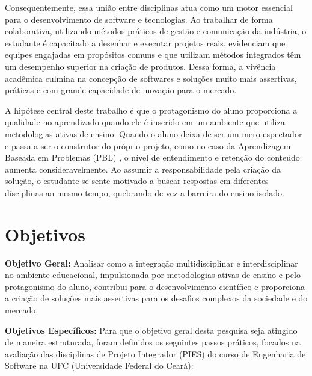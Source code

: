 Consequentemente, essa união entre disciplinas atua como um motor essencial
para o desenvolvimento de software e tecnologias. Ao trabalhar de forma
colaborativa, utilizando métodos práticos de gestão e comunicação da indústria,
o estudante é capacitado a desenhar e executar projetos reais.  evidenciam que equipes engajadas em propósitos comuns e que utilizam
métodos integrados têm um desempenho superior na criação de produtos. Dessa
forma, a vivência acadêmica culmina na concepção de softwares e soluções muito
mais assertivas, práticas e com grande capacidade de inovação para o mercado.

A hipótese central deste trabalho é que o protagonismo do aluno proporciona a
qualidade no aprendizado quando ele é inserido em um ambiente que utiliza
metodologias ativas de ensino. Quando o aluno deixa de ser um mero espectador e
passa a ser o construtor do próprio projeto, como no caso da Aprendizagem
Baseada em Problemas (PBL) \cite{ribeiro2025interdisciplinaridade}, o nível de entendimento e retenção do conteúdo
aumenta consideravelmente. Ao assumir a responsabilidade pela criação da
solução, o estudante se sente motivado a buscar respostas em diferentes
disciplinas ao mesmo tempo, quebrando de vez a barreira do ensino isolado.

\section{Objetivos}

\textbf{Objetivo Geral:} Analisar como a integração multidisciplinar e interdisciplinar no ambiente educacional, impulsionada por metodologias ativas de ensino e pelo protagonismo do aluno, contribui para o desenvolvimento científico e proporciona a criação de soluções mais assertivas para os desafios complexos da sociedade e do mercado.

\textbf{Objetivos Específicos:} Para que o objetivo geral desta pesquisa seja atingido de maneira estruturada, foram definidos os seguintes passos práticos, focados na avaliação das disciplinas de Projeto Integrador (PIES) do curso de Engenharia de Software na UFC (Universidade Federal do Ceará):

